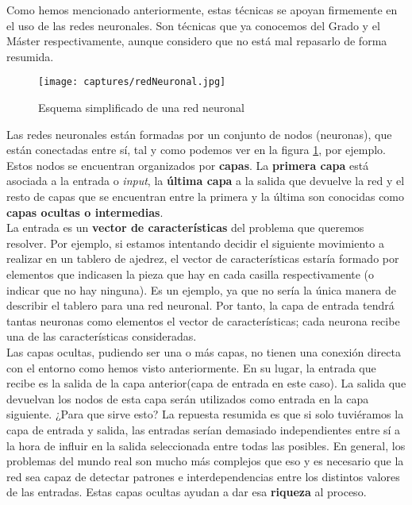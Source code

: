 \documentclass[11pt,fleqn]{book} %
\begin{document}
Como hemos mencionado anteriormente, estas técnicas se apoyan firmemente en el uso de las redes neuronales. Son técnicas que ya conocemos del Grado y el Máster respectivamente, aunque considero que no está mal repasarlo de forma resumida. \\

\begin{figure}[H]
	\centering\texttt{[image: captures/redNeuronal.jpg]}
	\caption{Esquema simplificado de una red neuronal \cite{article:redNeuronal}}
	\label{fig:redNeuronal} %
\end{figure}

Las redes neuronales están formadas por un conjunto de nodos (neuronas), que están conectadas entre sí, tal y como podemos ver en la figura \ref{fig:redNeuronal}, por ejemplo. \\

Estos nodos se encuentran organizados por \textbf{capas}. La \textbf{primera capa} está asociada a la entrada o \textit{input}, la \textbf{última capa} a la salida que devuelve la red y el resto de capas que se encuentran entre la primera y la última son conocidas como \textbf{capas ocultas o intermedias}. \\

La entrada es un \textbf{vector de características} del problema que queremos resolver. Por ejemplo, si estamos intentando decidir el siguiente movimiento a realizar en un tablero de ajedrez, el vector de características estaría formado por elementos que indicasen la pieza que hay en cada casilla respectivamente (o indicar que no hay ninguna). Es un ejemplo, ya que no sería la única manera de describir el tablero para una red neuronal. Por tanto, la capa de entrada tendrá tantas neuronas como elementos el vector de características; cada neurona recibe una de las características consideradas. \\

Las capas ocultas, pudiendo ser una o más capas, no tienen una conexión directa con el entorno como hemos visto anteriormente. En su lugar, la entrada que recibe es la salida de la capa anterior(capa de entrada en este caso). La salida que devuelvan los nodos de esta capa serán utilizados como entrada en la capa siguiente. ¿Para que sirve esto? La repuesta resumida es que si solo tuviéramos la capa de entrada y salida, las entradas serían demasiado independientes entre sí a la hora de influir en la salida seleccionada entre todas las posibles. En general, los problemas del mundo real son mucho más complejos que eso y es necesario que la red sea capaz de detectar patrones e interdependencias entre los distintos valores de las entradas. Estas capas ocultas ayudan a dar esa \textbf{riqueza} al proceso.\cite{article:redNeuronal2}\\
\end{document}
